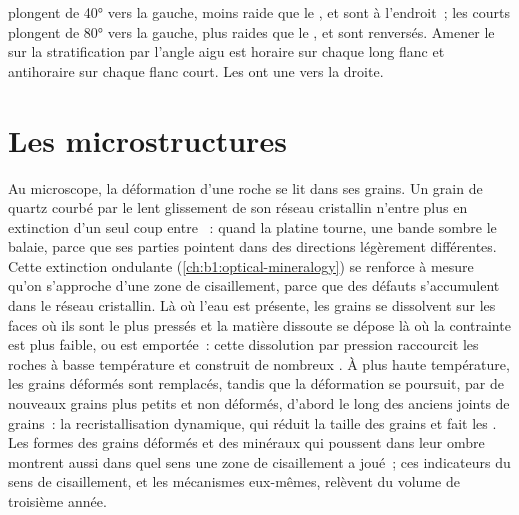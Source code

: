 \begin{omfigure}
{plongent de \ang{40} vers la gauche, moins raide que le , et sont à
l'endroit~; les  courts plongent de \ang{80} vers la gauche, plus raides que le
, et sont renversés. Amener le  sur la stratification par
l'angle aigu est horaire sur chaque long flanc et antihoraire sur chaque
flanc court. Les  ont une  vers la droite.}
\label{fig:b1:faults-folds-fabrics:vergence}
\end{omfigure}

\section{Les microstructures}\label{sec:b1:faults-folds-fabrics:micro}

Au microscope, la déformation d'une roche se lit dans ses grains. Un grain
de quartz courbé par le lent glissement de son réseau cristallin n'entre plus en
extinction d'un seul coup entre ~: quand la platine tourne, une bande sombre
le balaie, parce que ses parties pointent dans des directions légèrement différentes.
Cette extinction ondulante (\cref{ch:b1:optical-mineralogy}) se renforce à mesure qu'on s'approche
d'une zone de cisaillement, parce que des défauts s'accumulent dans le réseau cristallin.
Là où l'eau est présente, les grains se dissolvent sur les faces où ils sont le plus pressés
et la matière dissoute se dépose là où la contrainte est plus faible, ou est
emportée~: cette dissolution par pression raccourcit les roches à basse température et
construit de nombreux . À plus haute température, les grains déformés sont
remplacés, tandis que la déformation se poursuit, par de nouveaux grains plus petits et non déformés,
d'abord le long des anciens joints de grains~: la recristallisation dynamique, qui réduit
la taille des grains et fait les . Les formes des grains déformés et des minéraux qui poussent dans
leur ombre montrent aussi dans quel sens une zone de cisaillement a joué~; ces indicateurs du sens de cisaillement,
et les mécanismes eux-mêmes, relèvent du volume de troisième année.


